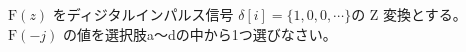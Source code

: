 $\textrm{F}(z)$ をディジタルインパルス信号 $\delta[i] = \{1,0,0,\cdots \}$の Z 変換とする。$\textrm{F}(-j)$ の値を選択肢a〜dの中から1つ選びなさい。
